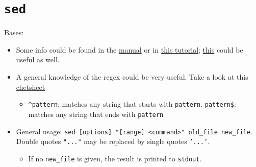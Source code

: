 \documentclass[a4paper,12pt,%
              final%
              ]{article}
\begin{document}
\section{\texttt{sed}}
Bases:
\begin{itemize}
  \item Some info could be found in the \href{https://www.gnu.org/software/sed/manual/sed.html}{manual} or in \href{http://www.grymoire.com/Unix/Sed.html}{this tutorial}; \href{https://www.tutorialspoint.com/unix/unix-regular-expressions.htm}{this} could be useful as well.
  \item A general knowledge of the regex could be very useful. Take a look at this \href{https://medium.com/factory-mind/regex-tutorial-a-simple-cheatsheet-by-examples-649dc1c3f285}{chetsheet}
    \begin{itemize}
      \item \verb|^pattern|: matches any string that starts with \texttt{pattern}. \verb|pattern$|: matches any string that ends with \texttt{pattern}
    \end{itemize}
  \item General usage: \verb|sed [options] "[range] <command>" old_file new_file|. Double quotes \texttt{"..."} may be replaced by single quotes \texttt{'...'}.
    \begin{itemize}
      \item If no \verb|new_file| is given, the result is printed to \texttt{stdout}.
    \end{itemize}
\end{itemize}
\end{document}
